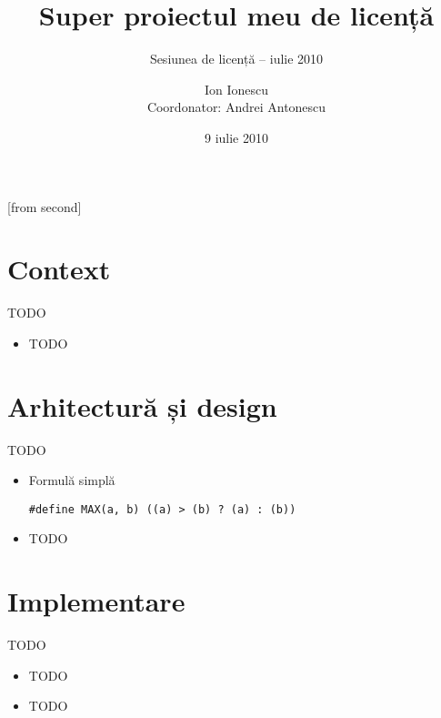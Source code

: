 \documentclass{beamer}
\title[Super proiectul meu de licență]{Super proiectul meu de licență}
\subtitle{Sesiunea de licență -- iulie 2010}
\institute{Facultatea de Automatică și Calculatoare,\\
	Universitatea POLITEHNICA București}
\author[Ion Ionescu]{Ion Ionescu\\
	Coordonator: Andrei Antonescu}
\date{9 iulie 2010}
\begin{document}
[from second]


\frame{\titlepage}

\frame{\tableofcontents}

\section{Context}

\begin{frame}{TODO}
	\begin{itemize}		%
		\item TODO
	\end{itemize}
\end{frame}

\section{Arhitectură și design}

\begin{frame}{TODO}
	\begin{itemize}
		\item Formulă simplă
			\begin{beamerboxesrounded}[lower=block body,shadow=true]{}
				\texttt{\#define MAX(a, b)   ((a) > (b) ? (a) : (b))}
			\end{beamerboxesrounded}
		\item TODO
	\end{itemize}
\end{frame}

\section{Implementare}

\begin{frame}{TODO}
	\begin{itemize}
		\item TODO
		\item TODO
	\end{itemize}
\end{frame}
\end{document}
